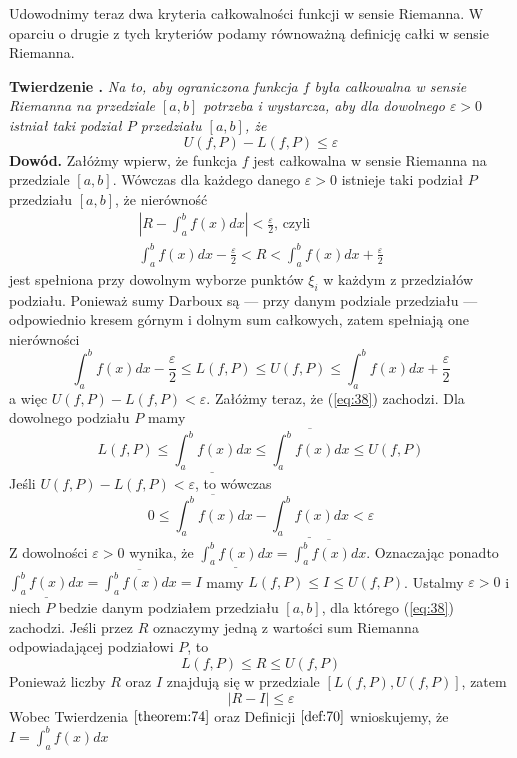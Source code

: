 \documentclass[leqno]{article}
\newcounter{thcounter}
\newcommand{\theorem}[1]{\noindent\refstepcounter{thcounter}\textbf{Twierdzenie \thethcounter. }\textit{#1}\label{theorem:\thethcounter}}
\newcommand{\proof}{\noindent\textbf{Dowód. }}
\begin{document}
\begin{justify}
Udowodnimy teraz dwa kryteria całkowalności funkcji w sensie Riemanna. W oparciu o drugie z tych kryteriów podamy równoważną definicję całki w sensie Riemanna.

\theorem{Na to, aby ograniczona funkcja $f$ była całkowalna w sensie Riemanna na przedziale $[a,b]$ potrzeba i wystarcza, aby dla dowolnego $\varepsilon > 0$ istniał taki podział $P$ przedziału $[a,b]$, że}
\begin{equation}\label{eq:38}
U(f, P) - L(f, P) \leqslant \varepsilon
\end{equation}
\proof{}Załóżmy wpierw, że funkcja $f$ jest całkowalna w sensie Riemanna na przedziale $[a,b]$. Wówczas dla każdego danego $\varepsilon > 0$ istnieje taki podział $P$ przedziału $[a,b]$, że nierówność
\begin{equation*}
\begin{gathered}
    |R - \int_{a}^{b} f(x)dx| < \frac{\varepsilon}{2} \text{, czyli} \\
    \int_{a}^{b} f(x)dx - \frac{\varepsilon}{2} < R < \int_{a}^{b} f(x)dx + \frac{\varepsilon}{2}
\end{gathered}
\end{equation*}
jest spełniona przy dowolnym wyborze punktów $\xi_i$ w każdym z przedziałów podziału. Ponieważ sumy Darboux są --- przy danym podziale przedziału --- odpowiednio kresem górnym i dolnym sum całkowych, zatem spełniają one nierówności
\[
\int_{a}^{b}f(x)dx - \frac{\varepsilon}{2} \leqslant L(f,P) \leqslant U(f, P) \leqslant \int_{a}^{b}f(x)dx + \frac{\varepsilon}{2}
\]
a więc $U(f, P) - L(f, P) < \varepsilon$.
Załóżmy teraz, że (\ref{eq:38}) zachodzi. Dla dowolnego podziału $P$ mamy
\[
L(f, P) \leqslant \underline{\int_{a}^{b}f(x)dx} \leqslant \overline{\int_{a}^{b}f(x)dx} \leqslant U(f, P)
\]
Jeśli $U(f, P) - L(f, P) < \varepsilon$, to wówczas
\[
0 \leqslant \overline{\int_{a}^{b}f(x)dx} - \underline{\int_{a}^{b}f(x)dx} < \varepsilon
\]
Z dowolności $\varepsilon > 0$ wynika, że $\underline{\int_{a}^{b}f(x)dx} = \overline{\int_{a}^{b}f(x)dx}$. Oznaczając ponadto $\underline{\int_{a}^{b}f(x)dx} = \overline{\int_{a}^{b}f(x)dx} = I$ mamy $L(f, P) \leqslant I \leqslant U(f, P)$.
Ustalmy $\varepsilon > 0$ i niech $P$ bedzie danym podziałem przedziału $[a,b]$, dla którego (\ref{eq:38}) zachodzi. Jeśli przez $R$ oznaczymy jedną z wartości sum Riemanna odpowiadającej podziałowi $P$, to
\[
L(f,P) \leqslant R \leqslant U(f, P)
\]
Ponieważ liczby $R$ oraz $I$ znajdują się w przedziale $[L(f, P), U(f, P)]$, zatem
\[
|R - I| \leqslant \varepsilon
\]
Wobec Twierdzenia $\ref{theorem:74}$ oraz Definicji $\ref{def:70}$ wnioskujemy, że $I = \int_{a}^{b}f(x)dx$


\end{justify}
\end{document}
